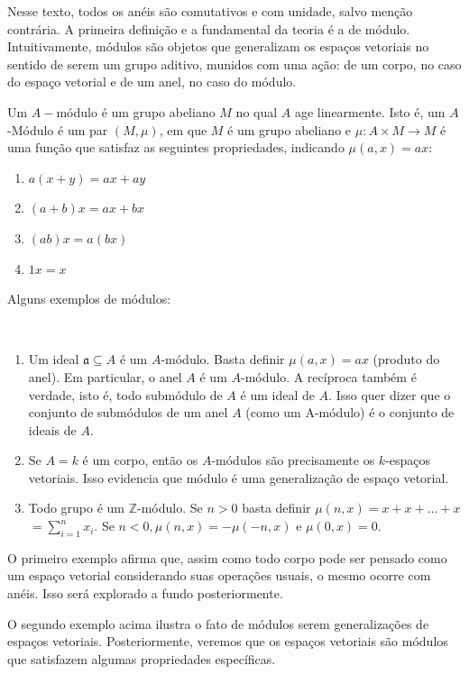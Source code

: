 \label{loc:módulos}
\recuo Nesse texto, todos os anéis são comutativos e com unidade, salvo menção contrária.
A primeira definição e a fundamental da teoria é a de módulo. Intuitivamente, módulos são objetos que generalizam os espaços vetoriais no sentido de serem um grupo aditivo, munidos com uma ação: de um corpo, no caso do espaço vetorial e de um anel, no caso do módulo.
\begin{definition}
	\label{loc:def_1_:_módulos_e_homomorfismos.definição}
	Um $A-$módulo é um grupo abeliano $M$ no qual $A$ age linearmente.
	Isto é, um $A$-Módulo é um par $(M, \mu)$, em que $M$ é um grupo abeliano e $\mu:A \times M \to M$ é uma função que satisfaz as seguintes propriedades, indicando $\mu(a, x) = ax$:
	\begin{enumerate}
		\item $a(x+y) = ax + ay$
		\item $(a+b)x = ax + bx$
		\item $(ab)x = a(bx)$
		\item $1x = x$
	\end{enumerate}
\end{definition}
Alguns exemplos de módulos:
\begin{examples}
	\label{loc:def_1_:_módulos_e_homomorfismos.exemplos}
	$ $\newline
	\begin{enumerate}
		\item Um ideal $\mathfrak{a}\subseteq A$ é um $A$-módulo. Basta definir $\mu(a,x) = ax$ (produto do anel). Em particular, o anel $A$ é um $A$-módulo. A recíproca também é verdade, isto é, todo submódulo de $A$ é um ideal de $A$. Isso quer dizer que o conjunto de submódulos de um anel $A$ (como um A-módulo) é o conjunto de ideais de $A$.
		\item Se $A=k$ é um corpo, então os $A$-módulos são precisamente os $k$-espaços vetoriais. Isso evidencia que módulo é uma generalização de espaço vetorial.
		\item Todo grupo é um $\mathbb{Z}$-módulo. Se $n>0$ basta definir $\mu(n,x) = x + x + \dots + x$ $= \sum_{i=1}^{n}x_i$. Se $n<0, \mu(n,x) = -\mu(-n,x)$ e $\mu(0,x)=0$.
	\end{enumerate}
\end{examples}
O primeiro exemplo afirma que, assim como todo corpo pode ser pensado como um espaço vetorial considerando suas operações usuais, o mesmo ocorre com anéis. Isso será explorado a fundo posteriormente.

O segundo exemplo acima ilustra o fato de módulos serem generalizações de espaços vetoriais. Posteriormente, veremos que os espaços vetoriais são módulos que satisfazem algumas propriedades específicas.

